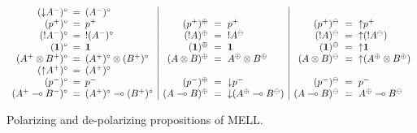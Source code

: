 \begin{figure}
{\small \[
\begin{array}{rcl|rcl|rcl}
({\downarrow}A^-)^\circ & \!\!\!=\!\!\! & (A^-)^\circ & & & & & & 
\\
(p^+)^\circ & \!\!\!=\!\!\! & p^+ &
(p^+)^\oplus & \!\!\!=\!\!\! & p^+ &
(p^+)^\ominus & \!\!\!=\!\!\! & {\uparrow}p^+
\\
({!}A^-)^\circ & \!\!\!=\!\!\! & {!}(A^-)^\circ &
({!}A)^\oplus & \!\!\!=\!\!\! & {!}A^\ominus &
({!}A)^\ominus & \!\!\!=\!\!\! & {\uparrow}({!}A^\ominus)
\\
(\one)^\circ & \!\!\!=\!\!\! & \one &
(\one)^\oplus & \!\!\!=\!\!\! & \one &
(\one)^\ominus & \!\!\!=\!\!\! & {\uparrow}\one 
\\
(A^+ \otimes B^+)^\circ & \!\!\!=\!\!\! & (A^+)^\circ \otimes (B^+)^\circ &
(A \otimes B)^\oplus & \!\!\!=\!\!\! & A^\oplus \otimes B^\oplus &
(A \otimes B)^\ominus & \!\!\!=\!\!\! & {\uparrow}(A^\oplus \otimes B^\oplus)
\\
({\uparrow}A^+)^\circ & \!\!\!=\!\!\! & (A^+)^\circ & & & & & & 
\\
(p^-)^\circ & \!\!\!=\!\!\! & p^- &
(p^-)^\oplus & \!\!\!=\!\!\! & {\downarrow}p^- &
(p^-)^\ominus & \!\!\!=\!\!\! & p^- 
\\
(A^+ \lolli B^-)^\circ & \!\!\!=\!\!\! & (A^+)^\circ \lolli (B^+)^\circ &
(A \lolli B)^\oplus & \!\!\!=\!\!\! & {\downarrow}(A^\oplus \lolli B^\ominus) &
(A \lolli B)^\ominus & \!\!\!=\!\!\! & A^\oplus \lolli B^\ominus
\end{array}
\]}

\caption{Polarizing and de-polarizing propositions of MELL.}
\label{fig:lin-shift}
\end{figure}
